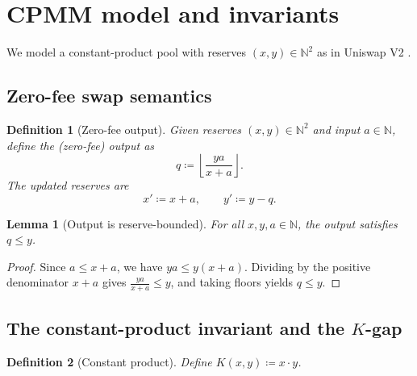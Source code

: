 \documentclass[11pt]{article}
\newtheorem{definition}{Definition}
\newtheorem{lemma}{Lemma}
\theoremstyle{remark}
\newcommand{\N}{\mathbb{N}}
\begin{document}
\section{CPMM model and invariants}
\label{sec:cpmm}

We model a constant-product pool with reserves $(x,y)\in\N^2$ as in Uniswap V2 \cite{uniswapv2}.

\subsection{Zero-fee swap semantics}

\begin{definition}[Zero-fee output]
Given reserves $(x,y)\in\N^2$ and input $a\in\N$, define the (zero-fee) output as
\begin{equation}
  q \coloneqq \left\lfloor \frac{y a}{x + a} \right\rfloor.
  \label{eq:cpmm-output}
\end{equation}
The updated reserves are
\begin{equation}
  x' \coloneqq x + a,\qquad
  y' \coloneqq y - q.
  \label{eq:cpmm-update}
\end{equation}
\end{definition}

\begin{lemma}[Output is reserve-bounded]
For all $x,y,a\in\N$, the output satisfies $q \le y$.
\end{lemma}
\begin{proof}
Since $a \le x+a$, we have $y a \le y(x+a)$. Dividing by the positive denominator $x+a$ gives
$\frac{y a}{x+a} \le y$, and taking floors yields $q \le y$.
\end{proof}

\subsection{The constant-product invariant and the \texorpdfstring{$K$}{K}-gap}

\begin{definition}[Constant product]
Define $K(x,y)\coloneqq x\cdot y$.
\end{definition}
\end{document}
